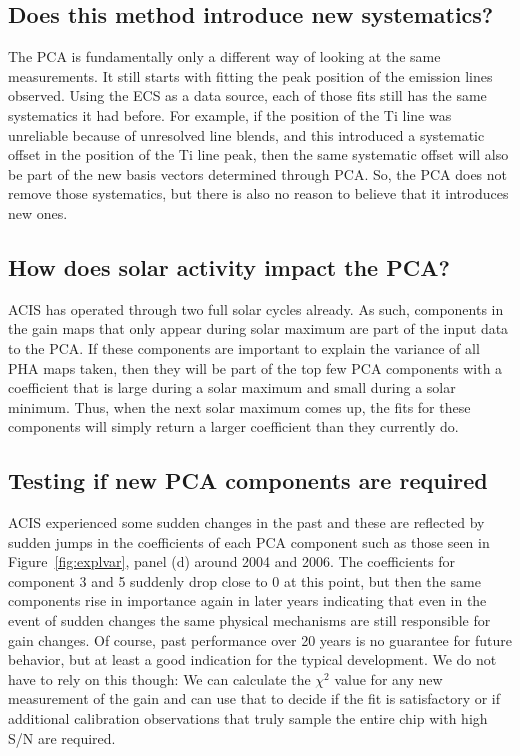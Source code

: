 \documentclass[]{spie}  %
\begin{document}
\subsection{Does this method introduce new systematics?}
The PCA is fundamentally only a different way of looking at the same measurements. It still starts with fitting the peak position of the emission lines observed. Using the ECS as a data source, each of those fits still has the same systematics it had before. For example, if the position of the Ti line was unreliable because of unresolved line blends, and this introduced a systematic offset in the position of the Ti line peak, then the same systematic offset will also be part of the new basis vectors determined through PCA. So, the PCA does not remove those systematics, but there is also no reason to believe that it introduces new ones.

\subsection{How does solar activity impact the PCA?}
ACIS has operated through two full solar cycles already. As such, components in the gain maps that only appear during solar maximum are part of the input data to the PCA. If these components are important to explain the variance of all PHA maps taken, then they will be part of the top few PCA components with a coefficient that is large during a solar maximum and small during a solar minimum. Thus, when the next solar maximum comes up, the fits for these components will simply return a larger coefficient than they currently do.

\subsection{Testing if new PCA components are required}
ACIS experienced some sudden changes in the past and these are reflected by sudden jumps in the coefficients of each PCA component such as those seen in Figure~\ref{fig:explvar}, panel (d) around 2004 and 2006. The coefficients for component 3 and 5 suddenly drop close to 0 at this point, but then the same components rise in importance again in later years indicating that even in the event of sudden changes the same physical mechanisms are still responsible for gain changes. Of course, past performance over 20 years is no guarantee for future behavior, but at least a good indication for the typical development. We do not have to rely on this though: We can calculate the $\chi^2$ value for any new measurement of the gain and can use that to decide if the fit is satisfactory or if additional calibration observations that truly sample the entire chip with high S/N are required.
\end{document}
